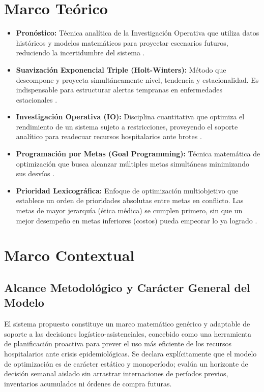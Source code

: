 \documentclass[conference]{IEEEtran}
\begin{document}
\section{Marco Teórico}
\begin{itemize}
    \item \textbf{Pronóstico:} Técnica analítica de la Investigación Operativa que utiliza datos históricos y modelos matemáticos para proyectar escenarios futuros, reduciendo la incertidumbre del sistema \cite{ref7, ref11}.
    \item \textbf{Suavización Exponencial Triple (Holt-Winters):} Método que descompone y proyecta simultáneamente nivel, tendencia y estacionalidad. Es indispensable para estructurar alertas tempranas en enfermedades estacionales \cite{ref9}.
    \item \textbf{Investigación Operativa (IO):} Disciplina cuantitativa que optimiza el rendimiento de un sistema sujeto a restricciones, proveyendo el soporte analítico para readecuar recursos hospitalarios ante brotes \cite{ref10}.
    \item \textbf{Programación por Metas (Goal Programming):} Técnica matemática de optimización que busca alcanzar múltiples metas simultáneas minimizando sus desvíos \cite{ref8}.
    \item \textbf{Prioridad Lexicográfica:} Enfoque de optimización multiobjetivo que establece un orden de prioridades absolutas entre metas en conflicto. Las metas de mayor jerarquía (ética médica) se cumplen primero, sin que un mejor desempeño en metas inferiores (costos) pueda empeorar lo ya logrado \cite{ref11, refGP}.
\end{itemize}


\section{Marco Contextual}
\subsection{Alcance Metodológico y Carácter General del Modelo}
El sistema propuesto constituye un marco matemático genérico y adaptable de soporte a las decisiones logístico-asistenciales, concebido como una herramienta de planificación proactiva para prever el uso más eficiente de los recursos hospitalarios ante crisis epidemiológicas. Se declara explícitamente que el modelo de optimización es de carácter estático y monoperíodo; evalúa un horizonte de decisión semanal aislado sin arrastrar internaciones de períodos previos, inventarios acumulados ni órdenes de compra futuras.
\end{document}
